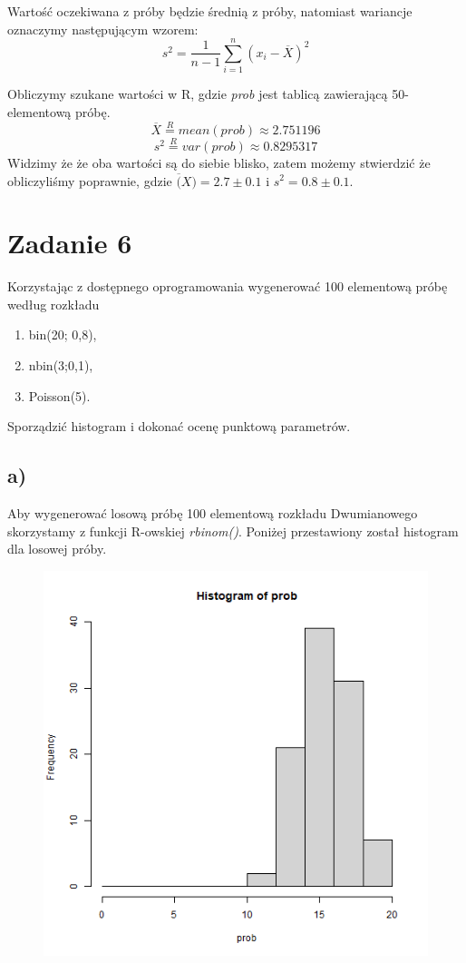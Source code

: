 \documentclass{article}
\begin{document}
Wartość oczekiwana z próby będzie średnią z próby, natomiast wariancje oznaczymy następującym wzorem:
\[ s^2 = \frac{1}{n-1}\sum_{i=1}^n (x_i - \overline{X})^2 \]

Obliczymy szukane wartości w R, gdzie \textit{prob} jest tablicą zawierającą 50-elementową próbę.
\[ \overline{X} \overset{R}{=} mean(prob) \approx 2.751196 \]
\[ s^2 \overset{R}{=} var(prob) \approx 0.8295317 \]
Widzimy że że oba wartości są do siebie blisko, zatem możemy stwierdzić że obliczyliśmy poprawnie, gdzie $\overline(X) = 2.7 \pm 0.1$ i $s^2 = 0.8 \pm 0.1$.

\newpage
\section{Zadanie 6}
Korzystając z dostępnego oprogramowania wygenerować 100 elementową próbę według rozkładu
\begin{enumerate}[label = \alph*)]
\item bin(20; 0,8),
\item nbin(3;0,1),
\item Poisson(5).
\end{enumerate}
Sporządzić histogram i dokonać ocenę punktową parametrów. \\ \par

\subsection{a)}
Aby wygenerować losową próbę 100 elementową rozkładu Dwumianowego skorzystamy z funkcji R-owskiej \textit{rbinom()}. Poniżej przestawiony został histogram dla losowej próby.
\begin{figure}[h!]
\begin{center}
\includegraphics[height = 0.5\textheight, angle = 0]{"lab7zad6_a.png"}
\end{center}
\end{figure}
\end{document}
